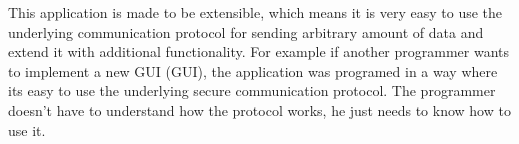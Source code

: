 This application is made to be extensible, which means it is very easy to use the underlying communication protocol for sending arbitrary amount of data and extend it with additional functionality. For example if another programmer wants to implement a new GUI (\acl{GUI}), the application was programed in a way where its easy to use the underlying secure communication protocol. The programmer doesn't have to understand how the protocol works, he just needs to know how to use it.

